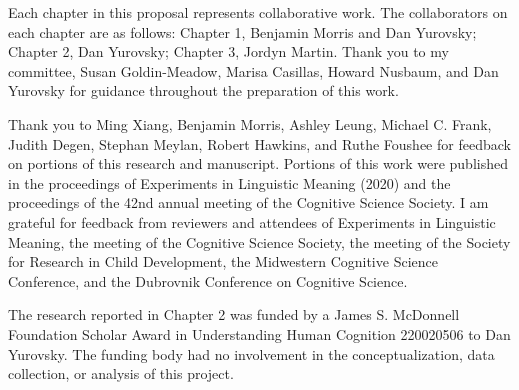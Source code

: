\documentclass{ucetd}
\date{August 2023}
\title{\thesistitle}
\author{\thesisauthor}
\begin{document}
\maketitle



\newpage
{}
\tableofcontents
{}
\newpage
{}
\listoffigures
\newpage
{}
\listoftables
\newpage

\acknowledgments
Each chapter in this proposal represents collaborative work. The collaborators on each chapter are as follows: Chapter 1, Benjamin Morris and Dan Yurovsky; Chapter 2, Dan Yurovsky; Chapter 3, Jordyn Martin. Thank you to my committee, Susan Goldin-Meadow, Marisa Casillas, Howard Nusbaum, and Dan Yurovsky for guidance throughout the preparation of this work.

Thank you to Ming Xiang, Benjamin Morris, Ashley Leung, Michael C. Frank, Judith Degen, Stephan Meylan, Robert Hawkins, and Ruthe Foushee for feedback on portions of this research and manuscript. Portions of this work were published in the proceedings of Experiments in Linguistic Meaning (2020) and the proceedings of the 42nd annual meeting of the Cognitive Science Society. I am grateful for feedback from reviewers and attendees of Experiments in Linguistic Meaning, the meeting of the Cognitive Science Society, the meeting of the Society for Research in Child Development, the Midwestern Cognitive Science Conference, and the Dubrovnik Conference on Cognitive Science.

The research reported in Chapter 2 was funded by a James S. McDonnell Foundation Scholar Award in Understanding Human Cognition 220020506 to Dan Yurovsky. The funding body had no involvement in the conceptualization, data collection, or analysis of this project.
\end{document}
